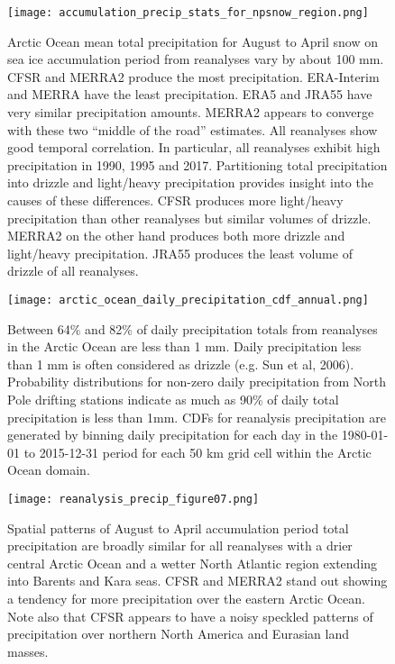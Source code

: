 \documentclass{article}
\begin{document}
\begin{figure}[h!]
  \texttt{[image: accumulation\_precip\_stats\_for\_npsnow\_region.png]}
  \caption{Arctic Ocean mean total precipitation for August to April
    snow on sea ice accumulation period from reanalyses vary by about
    100 mm.  CFSR and MERRA2 produce the most precipitation.  ERA-Interim
    and MERRA have the least precipitation.  ERA5 and JRA55 have very
    similar precipitation amounts.  MERRA2 appears to converge with these two
    ``middle of the road'' estimates.  All reanalyses show good temporal
    correlation.  In particular, all reanalyses exhibit high precipitation in
    1990, 1995 and 2017.  Partitioning total precipitation into drizzle and
    light/heavy precipitation provides insight into the causes of these
    differences.  CFSR produces more light/heavy precipitation than other
    reanalyses but similar volumes of drizzle.  MERRA2 on the other hand
    produces both more drizzle and light/heavy precipitation.  JRA55
    produces the least volume of drizzle of all reanalyses.}
\end{figure}

\newpage

\begin{figure}[h!]
  \texttt{[image: arctic\_ocean\_daily\_precipitation\_cdf\_annual.png]}
  \caption{Between 64\% and 82\% of daily precipitation totals from reanalyses
    in the Arctic Ocean are less than 1 mm.  Daily precipitation less than 1 mm
    is often considered as drizzle (e.g. Sun et al, 2006).  Probability
    distributions for non-zero daily precipitation from North Pole drifting
    stations indicate as much as 90\% of daily total precipitation is less
    than 1mm.  CDFs for reanalysis precipitation are generated by binning
    daily precipitation for each day in the 1980-01-01 to 2015-12-31 period
    for each 50 km grid cell within the Arctic Ocean domain.}
\end{figure}

\newpage

\begin{figure}[h!]
  \texttt{[image: reanalysis\_precip\_figure07.png]}
  \caption{Spatial patterns of August to April accumulation period total
    precipitation are broadly similar for all reanalyses with a drier central
    Arctic Ocean and a wetter North Atlantic region extending into Barents
    and Kara seas.  CFSR and MERRA2 stand out showing a tendency for more
    precipitation over the eastern Arctic Ocean.  Note also that CFSR appears
    to have a noisy speckled patterns of precipitation over northern
    North America and Eurasian land masses.}
\end{figure}
\end{document}
